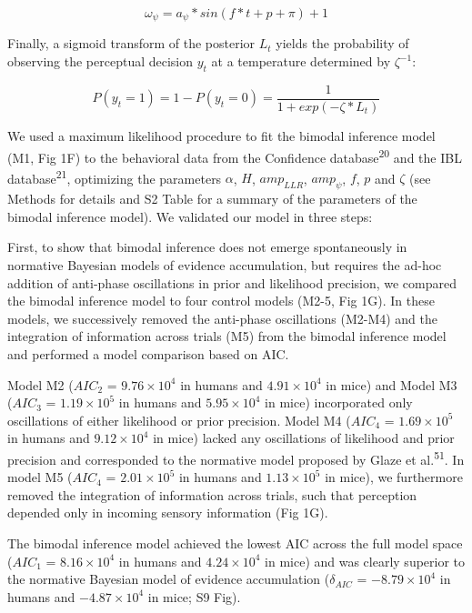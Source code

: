 \documentclass[
]{article}
\begin{document}
\begin{equation}
\omega_{\psi} = a_{\psi} * sin(f * t + p + \pi) + 1
\end{equation}

Finally, a sigmoid transform of the posterior \(L_t\) yields the
probability of observing the perceptual decision \(y_t\) at a
temperature determined by \(\zeta^{-1}\):

\begin{equation}
P(y_t = 1) = 1 - P(y_t = 0) = \frac{1}{1 + exp(-\zeta * L_t)}
\end{equation}

We used a maximum likelihood procedure to fit the bimodal inference
model (M1, Fig 1F) to the behavioral data from the Confidence
database\textsuperscript{20} and the IBL database\textsuperscript{21},
optimizing the parameters \(\alpha\), \(H\), \(amp_{LLR}\),
\(amp_{\psi}\), \(f\), \(p\) and \(\zeta\) (see Methods for details and
S2 Table for a summary of the parameters of the bimodal
inference model). We validated our model in three steps:

First, to show that bimodal inference does not emerge spontaneously in
normative Bayesian models of evidence accumulation, but requires the
ad-hoc addition of anti-phase oscillations in prior and likelihood
precision, we compared the bimodal inference model to four control
models (M2-5, Fig 1G). In these models, we successively removed the
anti-phase oscillations (M2-M4) and the integration of information
across trials (M5) from the bimodal inference model and performed a
model comparison based on AIC.

Model M2 (\(AIC_2\) = \(\ensuremath{9.76\times 10^{4}}\) in humans and
\(\ensuremath{4.91\times 10^{4}}\) in mice) and Model M3 (\(AIC_3\) =
\(\ensuremath{1.19\times 10^{5}}\) in humans and
\(\ensuremath{5.95\times 10^{4}}\) in mice) incorporated only
oscillations of either likelihood or prior precision. Model M4
(\(AIC_4\) = \(\ensuremath{1.69\times 10^{5}}\) in humans and
\(\ensuremath{9.12\times 10^{4}}\) in mice) lacked any oscillations of
likelihood and prior precision and corresponded to the normative model
proposed by Glaze et al.\textsuperscript{51}. In model M5 (\(AIC_4\) =
\(\ensuremath{2.01\times 10^{5}}\) in humans and
\(\ensuremath{1.13\times 10^{5}}\) in mice), we furthermore removed the
integration of information across trials, such that perception depended
only in incoming sensory information (Fig 1G).

The bimodal inference model achieved the lowest AIC across the full
model space (\(AIC_1\) = \(\ensuremath{8.16\times 10^{4}}\) in humans
and \(\ensuremath{4.24\times 10^{4}}\) in mice) and was clearly superior
to the normative Bayesian model of evidence accumulation
(\(\delta_{AIC}\) = \(\ensuremath{-8.79\times 10^{4}}\) in humans and
\(\ensuremath{-4.87\times 10^{4}}\) in mice; S9 Fig).
\end{document}
